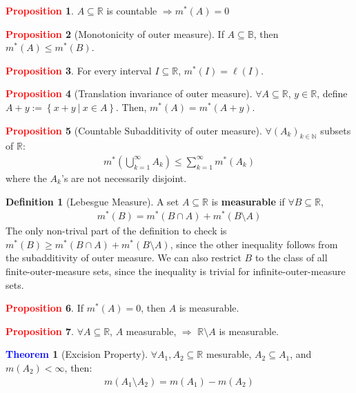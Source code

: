 \documentclass[reqno,11pt]{amsart}
\theoremstyle{definition}
\newcommand{\bb}[1]{\mathbb{#1}}
\newcommand{\sets}[2]{ \left\{ #1\ |\ #2 \right\}}
\newtheorem{theorem}{\textcolor{blue}{Theorem}}
\theoremstyle{definition}
\newtheorem{definition}{\textcolor{OliveGreen}{Definition}}
\newtheorem{prop}{\textcolor{red}{Proposition}}
\theoremstyle{remark}
\begin{document}
\begin{prop}
	$A \subseteq \bb{R}$ is countable $\Rightarrow m^*(A) = 0$ 
\end{prop}
\begin{prop}[Monotonicity of outer measure]
		If $A \subseteq \bb{B}$, then $m^*(A) \leq m^*(B)$. 
\end{prop}
\begin{prop}
	For every interval $I \subseteq \bb{R}$, $m^*(I) = \ell(I)$. 	
\end{prop}
\begin{prop}[Translation invariance of outer measure]
	$\forall A \subseteq \bb{R}$, $ y \in \bb{R}$, define $A+y := \sets{x+y}{x \in A}$. Then, $m^*(A) = m^*(A+y)$. 
\end{prop}

\begin{prop}[Countable Subadditivity of outer measure] 
	$\forall (A_k)_{k \in \bb{N}}$ subsets of $\bb{R}$: 
	\begin{align}
		m^* \left(  \bigcup_{k=1}^\infty A_k \right)  \leq \sum_{k=1}^\infty m^*(A_k) 
	\end{align}
	where the $A_k$'s are not necessarily disjoint. 
\end{prop}

\begin{definition}[Lebesgue Measure]
	A set $A \subseteq \bb{R}$ is \textbf{measurable} if $\forall B \subseteq \bb{R}$, 
	\begin{align}
		m^*(B) = m^*(B \cap A) + m^*(B \setminus A) 
	\end{align}
	The only non-trival part of the definition to check is $		m^*(B) \geq m^*(B \cap A) + m^*(B \setminus A) $, since the other inequality follows from the subadditivity of outer measure. We can also restrict $B$ to the class of all finite-outer-measure sets, since the inequality is trivial for infinite-outer-measure sets. 
\end{definition}

\begin{prop}
	If $m^*(A) = 0$, then $A$ is measurable. 
\end{prop}

\begin{prop}
	$\forall A \subseteq \bb{R}$, $A$ measurable, $\Rightarrow$ $\bb{R} \setminus A$ is measurable. 
\end{prop}

\begin{theorem}[Excision Property]
	$\forall A_1, A_2 \subseteq \bb{R}$ mesurable, $A_2 \subseteq A_1$, and $m(A_2) < \infty$, then: 
	\begin{align}
		m(A_1 \setminus A_2) = m(A_1) - m(A_2) 
	\end{align}	
\end{theorem}
\end{document}
